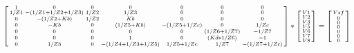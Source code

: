 \begin{equation}
\begin{bsmallmatrix}
1 & 0 & 0 & 0 & 0 & 0 & 0\\
1/Z1 & -(1/Z1 + 1/Z2 + 1/Z3) & 1/Z2 & 1/Z3 & 0 & 0 & 0\\
0 & -(1/Z2 + Kb) & 1/Z2 & Kb & 0 & 0 & 0\\
0 & -Kb & 0 & (1/Z5 + Kb) & -(1/Z5+1/Zc) & 0 & 1/Zc\\
0 & 0 & 0 & 0 & 0 & (1/Z6 + 1/Z7) & -1/Z7\\
0 & 0 & 0 & 1 & 0 & (Kd * 1/Z6) & -1\\
0 & 1/Z3 & 0 & -(1/Z4 + 1/Z3 + 1/Z5) & 1/Z5+1/Zc & 1/Z7 & -(1/Z7+1/Zc)\\
\end{bsmallmatrix}
*
\begin{bsmallmatrix}
V1\\V2\\V3\\V5\\V6\\V7\\V8
\end{bsmallmatrix}
=
\begin{bsmallmatrix}
Vsf\\0\\0\\0\\0\\0\\0
\end{bsmallmatrix}
\end{equation}
